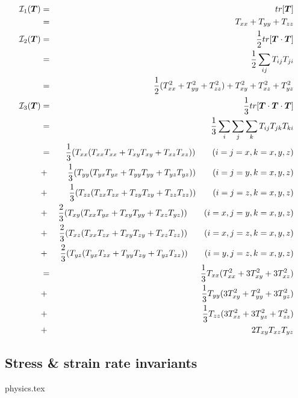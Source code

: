 \begin{eqnarray}
{\cal I}_1({\bm T}) 
&=& tr[\bm{T}] \\
&=& T_{xx} + T_{yy} + T_{zz} \\ 
{\cal I}_2({\bm T}) 
&=& \frac{1}{2} tr[{\bm T}\cdot{\bm T}] \\
&=& \frac{1}{2} \sum_{ij} T_{ij} T_{ji} \\
&=& \frac{1}{2} (T_{xx}^2 + T_{yy}^2 + T_{zz}^2) + T_{xy}^2 + T_{xz}^2 + T_{yz}^2 \\ 
{\cal I}_3({\bm T}) 
&=& \frac{1}{3} tr[{\bm T}\cdot{\bm T}\cdot {\bm T}]   \\
&=& \frac{1}{3}\sum_i\sum_j \sum_k T_{ij} T_{jk} T_{ki}  \\
&=& \frac{1}{3} (T_{xx} ( T_{xx}T_{xx} + T_{xy}T_{xy} + T_{xz}T_{xz} )) \qquad (i=j=x,k=x,y,z)\nonumber\\ 
&+& \frac{1}{3} (T_{yy} ( T_{yx}T_{yx} + T_{yy}T_{yy} + T_{yz}T_{yz} )) \qquad (i=j=y,k=x,y,z)\nonumber\\ 
&+& \frac{1}{3} (T_{zz} ( T_{zx}T_{zx} + T_{zy}T_{zy} + T_{zz}T_{zz} )) \qquad (i=j=z,k=x,y,z)\nonumber\\ 
&+& \frac{2}{3} (T_{xy} ( T_{xx}T_{yx} + T_{xy}T_{yy} + T_{xz}T_{yz} )) \qquad (i=x,j=y,k=x,y,z)\nonumber\\ 
&+& \frac{2}{3} (T_{xz} ( T_{xx}T_{zx} + T_{xy}T_{zy} + T_{xz}T_{zz} )) \qquad (i=x,j=z,k=x,y,z)\nonumber\\ 
&+& \frac{2}{3} (T_{yz} ( T_{yx}T_{zx} + T_{yy}T_{zy} + T_{yz}T_{zz} )) \qquad (i=y,j=z,k=x,y,z)\nonumber\\ 
&=& \frac{1}{3} T_{xx} (  T_{xx}^2 + 3 T_{xy}^2 + 3 T_{xz}^2  )     \nonumber\\
&+& \frac{1}{3} T_{yy} (3 T_{xy}^2 +   T_{yy}^2 + 3 T_{yz}^2  )     \nonumber\\
&+& \frac{1}{3} T_{zz} (3 T_{xz}^2 + 3 T_{yz}^2 +   T_{zz}^2)       \nonumber\\
&+& 2 T_{xy} T_{xz} T_{yz}  
\end{eqnarray}




\subsection{Stress \& strain rate invariants}\label{sec:stress_invariants}
\begin{flushright} {\tiny {\color{gray} physics.tex}} \end{flushright}

